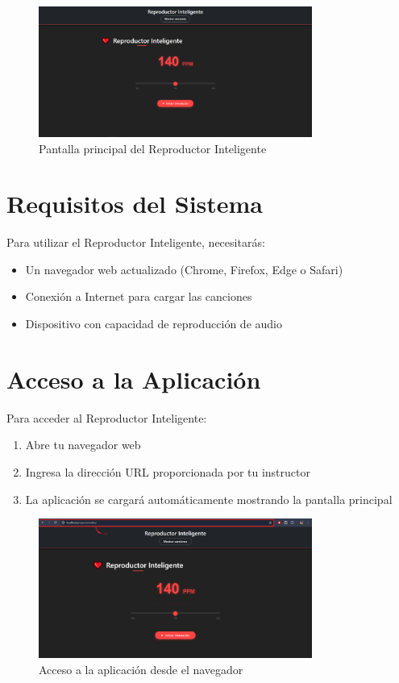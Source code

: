 \documentclass[a4paper,12pt]{article}
\begin{document}
\begin{figure}[h]
    \centering
    \includegraphics[width=0.8\textwidth]{imagenes/pantalla_principal.png}
    \caption{Pantalla principal del Reproductor Inteligente}
\end{figure}

\section{Requisitos del Sistema}
Para utilizar el Reproductor Inteligente, necesitarás:
\begin{itemize}
    \item Un navegador web actualizado (Chrome, Firefox, Edge o Safari)
    \item Conexión a Internet para cargar las canciones
    \item Dispositivo con capacidad de reproducción de audio
\end{itemize}

\section{Acceso a la Aplicación}
Para acceder al Reproductor Inteligente:
\begin{enumerate}
    \item Abre tu navegador web
    \item Ingresa la dirección URL proporcionada por tu instructor
    \item La aplicación se cargará automáticamente mostrando la pantalla principal
\end{enumerate}

 \begin{figure}[h]
     \centering
     \includegraphics[width=0.8\textwidth]{imagenes/acceso_navegador.png}
     \caption{Acceso a la aplicación desde el navegador}
 \end{figure}
\end{document}
